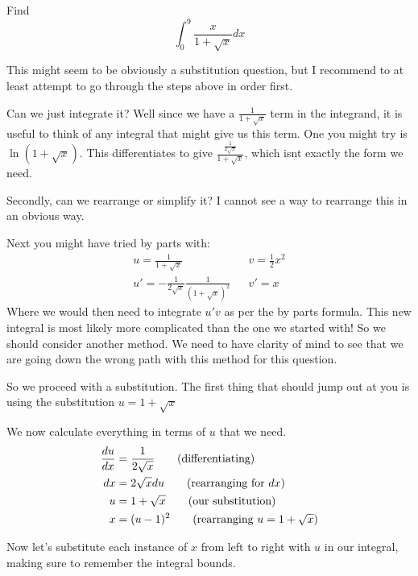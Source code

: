 \begin{example}
    Find 
    \[ \int_0^9 \frac{x}{1 + \sqrt{x}}dx\]
\end{example}
\begin{solution}
    This might seem to be obviously a substitution question, but I recommend to at least attempt to go through the steps above in order first.

    Can we just integrate it? Well since we have a $\frac{1}{1 + \sqrt{x}}$ term in the integrand, it is useful to think of any integral that might give us this term. One you might try is 
    $\ln(1 + \sqrt{x})$. This differentiates to give $\frac{\frac{1}{2\sqrt{x}}}{1 + \sqrt{x}}$, which isnt exactly the form we need.

    Secondly, can we rearrange or simplify it? I cannot see a way to rearrange this in an obvious way.
    
    Next you might have tried by parts with:
    \begin{align*}
        u= \frac{1}{1+\sqrt{x}}&  &v= \frac{1}{2}x^2\\
        u' = -\frac{1}{2\sqrt{x}}\frac{1}{(1+\sqrt{x})^2}&  &v' = x
    \end{align*}
    Where we would then need to integrate $u'v$ as per the by parts formula. This new integral is most likely more complicated than the one we started with! So we should consider another method. We need to have 
    clarity of mind to see that we are going down the wrong path with this method for this question.


    So we proceed with a substitution. The first thing that should jump out at you is using the substitution $u = 1 + \sqrt{x}$
    
    We now calculate everything in terms of $u$ that we need.
    \begin{align*}
        \frac{du}{dx} &= \frac{1}{2\sqrt{x}} \tag{differentiating}\\
        dx&=2\sqrt{x}du \tag{rearranging for $dx$}\\
        u &= 1 + \sqrt{x} \tag{our substitution}\\
        x&= (u-1)^2 \tag{rearranging $u = 1 + \sqrt{x}$}
    \end{align*}

    Now let's substitute each instance of $x$ from left to right with $u$ in our integral, making sure to remember the integral bounds.


\end{solution}
